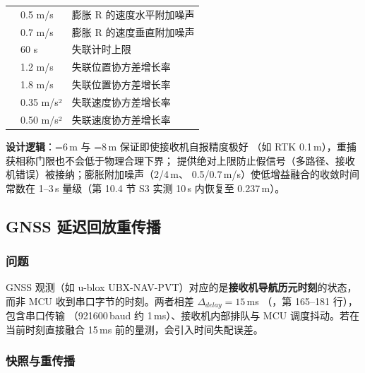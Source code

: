 \begin{table}[H]
\begin{tabularx}{\textwidth}{@{}L{6.2cm}C{2.6cm}X@{}}
 & 0.5 m/s & 膨胀 R 的速度水平附加噪声 \\
 & 0.7 m/s & 膨胀 R 的速度垂直附加噪声 \\
 & 60 s & 失联计时上限 \\
 & 1.2 m/s & 失联位置协方差增长率 \\
 & 1.8 m/s & 失联位置协方差增长率 \\
 & 0.35 m/s² & 失联速度协方差增长率 \\
 & 0.50 m/s² & 失联速度协方差增长率 \\
\bottomrule
\end{tabularx}
\end{table}

\textbf{设计逻辑}：=6\,m 与
=8\,m 保证即使接收机自报精度极好
（如 RTK 0.1\,m），重捕获相称门限也不会低于物理合理下界；
提供绝对上限防止假信号（多路径、接收机错误）被接纳；膨胀附加噪声（2/4\,m、
0.5/0.7\,m/s）使低增益融合的收敛时间常数在 1--3\,s 量级（第 10.4 节 S3
实测 10\,s 内恢复至 0.237\,m）。

\subsection{GNSS 延迟回放重传播}

\subsubsection{问题}

GNSS 观测（如 u-blox UBX-NAV-PVT）对应的是\textbf{接收机导航历元时刻}的状态，
而非 MCU 收到串口字节的时刻。两者相差 $\Delta_{delay} = 15$\,ms
（，第 165--181 行），包含串口传输
（921600\,baud 约 1\,ms）、接收机内部排队与 MCU 调度抖动。若在当前时刻直接融合
15\,ms 前的量测，会引入时间失配误差。

\subsubsection{快照与重传播}

